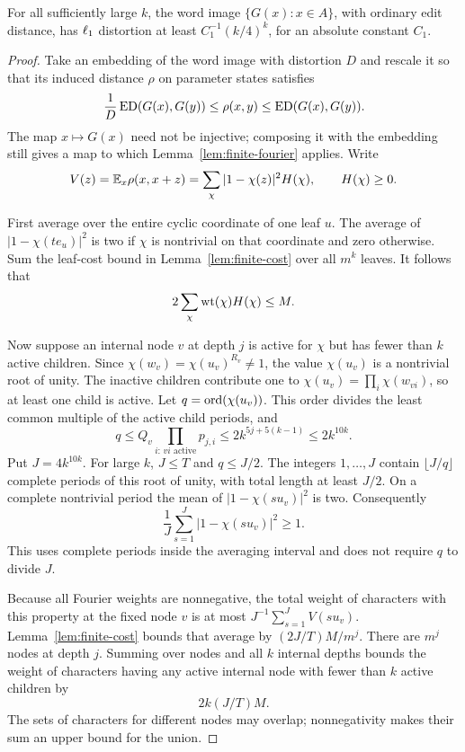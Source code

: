\begin{proposition}\label{prop:finite-lower}
For all sufficiently large $k$, the word image $\{G(x):x\in A\}$,
with ordinary edit distance, has $\ell_1$ distortion at least
$C_1^{-1}(k/4)^k$, for an absolute constant $C_1$.
\end{proposition}
\begin{proof}
Take an embedding of the word image with distortion $D$ and rescale it
so that its induced distance $\rho$ on parameter states satisfies
\[
 \frac1D\operatorname{ED}(G(x),G(y))\leq\rho(x,y)\leq\operatorname{ED}(G(x),G(y)).
\]
The map $x\mapsto G(x)$ need not be injective; composing it with the
embedding still gives a map to which Lemma~\ref{lem:finite-fourier}
applies. Write
\[
 V(z)=\mathbb E_x\rho(x,x+z)
 =\sum_\chi |1-\chi(z)|^2H(\chi),\qquad H(\chi)\geq0.
\]

First average over the entire cyclic coordinate of one leaf $u$.
The average of $|1-\chi(t e_u)|^2$ is two if $\chi$ is nontrivial on
that coordinate and zero otherwise. Sum the leaf-cost bound in
Lemma~\ref{lem:finite-cost} over all $m^k$ leaves. It follows that
\begin{equation}\label{eq:finite-leaf-mass}
 2\sum_\chi \operatorname{wt}(\chi)H(\chi)\leq M.
\end{equation}

Now suppose an internal node $v$ at depth $j$ is active for $\chi$ but
has fewer than $k$ active children. Since
$\chi(w_v)=\chi(u_v)^{R_v}\ne1$, the value $\chi(u_v)$ is a nontrivial
root of unity. The inactive children contribute one to
$\chi(u_v)=\prod_i\chi(w_{vi})$, so at least one child is active.
Let $q=\operatorname{ord}(\chi(u_v))$. This order divides the least common multiple
of the active child periods, and
\[
 q\leq Q_v\prod_{i:\,vi\text{ active}}p_{j,i}
 \leq2k^{5j+5(k-1)}\leq2k^{10k}.
\]
Put $J=4k^{10k}$. For large $k$, $J\leq T$ and $q\leq J/2$.
The integers $1,\ldots,J$ contain $\lfloor J/q\rfloor$ complete periods
of this root of unity, with total length at least $J/2$. On a complete
nontrivial period the mean of $|1-\chi(su_v)|^2$ is two. Consequently
\[
 \frac1J\sum_{s=1}^J |1-\chi(su_v)|^2\geq1.
\]
This uses complete periods inside the averaging interval and does not
require $q$ to divide $J$.

Because all Fourier weights are nonnegative, the total weight of
characters with this property at the fixed node $v$ is at most
$J^{-1}\sum_{s=1}^J V(su_v)$. Lemma~\ref{lem:finite-cost} bounds that
average by $(2J/T)M/m^j$. There are $m^j$ nodes at depth $j$.
Summing over nodes and all $k$ internal depths bounds the weight of
characters having any active internal node with fewer than $k$ active
children by
\begin{equation}\label{eq:finite-exceptional-mass}
 2k(J/T)M.
\end{equation}
The sets of characters for different nodes may overlap; nonnegativity
makes their sum an upper bound for the union.


\end{proof}
